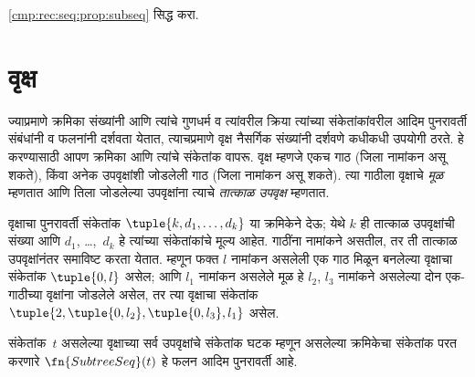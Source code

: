 \begin{prob}
  \ref{cmp:rec:seq:prop:subseq} सिद्ध करा.
\end{prob}











\section{वृक्ष}\label{cmp:rec:tre:sec}

ज्याप्रमाणे क्रमिका संख्यांनी आणि त्यांचे गुणधर्म व त्यांवरील क्रिया त्यांच्या
संकेतांकांवरील आदिम पुनरावर्ती संबंधांनी व फलनांनी दर्शवता येतात, त्याचप्रमाणे
वृक्ष नैसर्गिक संख्यांनी दर्शवणे कधीकधी उपयोगी ठरते. हे करण्यासाठी आपण
क्रमिका आणि त्यांचे संकेतांक वापरू. वृक्ष म्हणजे एकच गाठ (जिला नामांकन असू
शकते), किंवा अनेक उपवृक्षांशी जोडलेली गाठ (जिला नामांकन असू शकते). त्या
गाठीला वृक्षाचे \emph{मूळ} म्हणतात आणि तिला जोडलेल्या उपवृक्षांना त्याचे
\emph{तात्काळ उपवृक्ष} म्हणतात.

वृक्षाचा पुनरावर्ती संकेतांक $\tuple{k, d_1, \dots, d_k}$ या क्रमिकेने
देऊ; येथे $k$ ही तात्काळ उपवृक्षांची संख्या आणि $d_1$, \dots,~$d_k$ हे
त्यांच्या संकेतांकांचे मूल्य आहेत. गाठींना नामांकने असतील, तर ती तात्काळ
उपवृक्षांनंतर समाविष्ट करता येतात. म्हणून फक्त $l$ नामांकन असलेली एक गाठ
मिळून बनलेल्या वृक्षाचा संकेतांक $\tuple{0,l}$ असेल; आणि $l_1$ नामांकन
असलेले मूळ हे $l_2$, $l_3$ नामांकने असलेल्या दोन एक-गाठीच्या वृक्षांना
जोडलेले असेल, तर त्या वृक्षाचा संकेतांक $\tuple{2,
  \tuple{0, l_2}, \tuple{0, l_3}, l_1}$ असेल.

\begin{prop}
  \label{cmp:rec:tre:prop:subtreeseq}
  संकेतांक~$t$ असलेल्या वृक्षाच्या सर्व उपवृक्षांचे संकेतांक घटक म्हणून
  असलेल्या क्रमिकेचा संकेतांक परत करणारे $\fn{SubtreeSeq}(t)$ हे फलन
  आदिम पुनरावर्ती आहे.
\end{prop}

